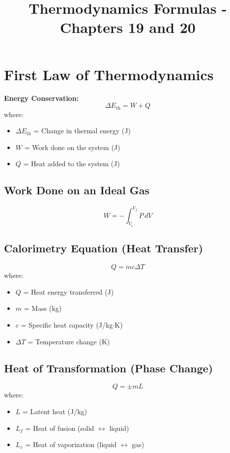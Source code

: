 \documentclass{article}
\begin{document}
\title{Thermodynamics Formulas - Chapters 19 and 20}
\author{}
\date{}
\maketitle

\section{First Law of Thermodynamics}
\textbf{Energy Conservation:}
\begin{equation}
\Delta E_{\text{th}} = W + Q
\end{equation}
where:
\begin{itemize}
    \item $\Delta E_{\text{th}}$ = Change in thermal energy (J)
    \item $W$ = Work done on the system (J)
    \item $Q$ = Heat added to the system (J)
\end{itemize}

\subsection{Work Done on an Ideal Gas}
\begin{equation}
W = - \int_{V_i}^{V_f} P \, dV
\end{equation}

\subsection{Calorimetry Equation (Heat Transfer)}
\begin{equation}
Q = mc \Delta T
\end{equation}
where:
\begin{itemize}
    \item $Q$ = Heat energy transferred (J)
    \item $m$ = Mass (kg)
    \item $c$ = Specific heat capacity (J/kg$\cdot$K)
    \item $\Delta T$ = Temperature change (K)
\end{itemize}

\subsection{Heat of Transformation (Phase Change)}
\begin{equation}
Q = \pm m L
\end{equation}
where:
\begin{itemize}
    \item $L$ = Latent heat (J/kg)
    \item $L_f$ = Heat of fusion (solid $\leftrightarrow$ liquid)
    \item $L_v$ = Heat of vaporization (liquid $\leftrightarrow$ gas)
\end{itemize}
\end{document}
